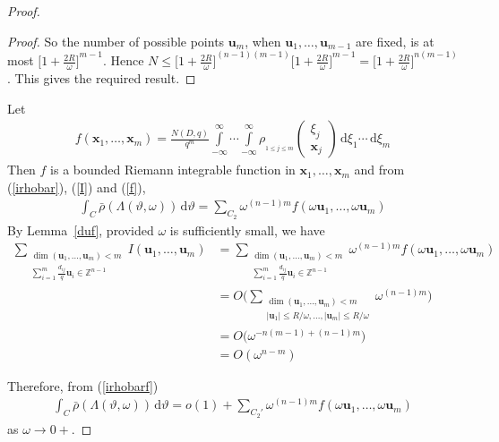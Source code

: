 \documentclass[11pt]{article}
\theoremstyle{definition}
\theoremstyle{proof}
\begin{document}
\begin{proof}
\begin{proof}
        So the number of possible points $\bm{u}_m$, when $\bm{u}_1, \ldots, \bm{u}_{m-1}$ are fixed, is at most $\displaystyle{\bigg[1+\frac{2R}{\omega }\bigg]}^{m-1}$.
        Hence $\displaystyle N \leq {\bigg[1 + \frac{2R}{\omega }\bigg]}^{(n-1)(m-1)} {\bigg[1+ \frac{2R}{\omega }\bigg]}^{m-1} = {\bigg[1+ \frac{2R}{\omega }\bigg]}^{n(m-1)}$.
        This gives the required result.
    \end{proof}

    Let
    \begin{align}\label{f}
        f(\bm{x}_1, \ldots, \bm{x}_m) = \frac{N(D, q)}{q^m} \int\limits_{-\infty}^{\infty} \cdots \int\limits_{-\infty}^{\infty} {\rho }_{_{1 \leq j \leq m}}
        \begin{pmatrix}
            \xi _j \\
            \bm{x}_j
        \end{pmatrix}
        \, \mathrm{d} \xi _1 \cdots \, \mathrm{d} \xi _m
    \end{align}
    Then $f$ is a bounded Riemann integrable function in $\bm{x}_1, \ldots, \bm{x}_m$ and from (\ref{irhobar}), (\ref{I}) and (\ref{f}),
    \begin{align}\label{irhobarf}
        \int_{C} \bar{\rho} (\Lambda (\vartheta , \omega )) \, \mathrm{d} \vartheta = \sum\limits_{C_2} {\omega }^{(n-1)m} f(\omega \bm{u}_1, \ldots, \omega \bm{u}_m)
    \end{align}
    By Lemma~\ref{duf}, provided $\omega$ is sufficiently small, we have
    \begin{align*}
        \sum_{\substack{\dim(\bm{u}_1, \ldots, \bm{u}_m) < m \\ \sum\limits_{i=1}^{m} \frac{d_{ij}}{q} \bm{u}_i \in \mathbb{Z}^{n-1}}} I(\bm{u}_1, \ldots, \bm{u}_m) &= \sum_{\substack{\dim(\bm{u}_1, \ldots, \bm{u}_m) < m \\ \sum\limits_{i=1}^{m} \frac{d_{ij}}{q} \bm{u}_i \in \mathbb{Z}^{n-1}}} \omega ^{(n-1)m} f(\omega \bm{u}_1, \ldots, \omega \bm{u}_m) \\
        &= O \Bigg(\sum_{\substack{\dim(\bm{u}_1, \ldots, \bm{u}_m) < m \\ |\bm{u}_1| \leq R/\omega , \ldots, |\bm{u}_m| \leq R/\omega }} \omega ^{(n-1)m}\Bigg) \\
        &= O\Big(\omega ^{-n(m-1) + (n-1)m}\Big) \\
        &= O(\omega ^{n-m})
    \end{align*}

    Therefore, from (\ref{irhobarf})
    \begin{align}\label{irhobarfapprox}
        \int_{C} \bar{\rho }(\Lambda (\vartheta , \omega )) \, \mathrm{d} \vartheta = o(1) + \sum\limits_{C_2 '}{\omega }^{(n-1)m} f(\omega \bm{u}_1, \ldots, \omega \bm{u}_m)
    \end{align}
    as $\omega \to 0+$.


\end{proof}
\end{document}
